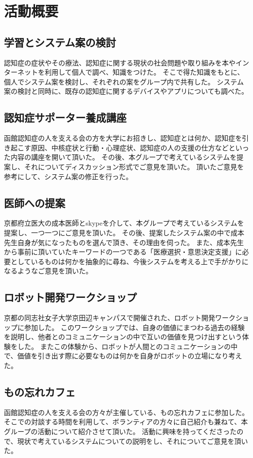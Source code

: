 \documentclass[../report]{subfiles}
\begin{document}
\section{活動概要}
\subsection{学習とシステム案の検討}\label{sec:kentou}
認知症の症状やその療法、認知症に関する現状の社会問題や取り組みを本やインターネットを利用して個人で調べ、知識をつけた。
そこで得た知識をもとに、個人でシステム案を検討し、それぞれの案をグループ内で共有した。
システム案の検討と同時に、既存の認知症に関するデバイスやアプリについても調べた。

\subsection{認知症サポーター養成講座}
函館認知症の人を支える会の方を大学にお招きし、認知症とは何か、認知症を引き起こす原因、中核症状と行動・心理症状、認知症の人の支援の仕方などといった内容の講座を開いて頂いた。
その後、本グループで考えているシステムを提案し、それについてディスカッション形式でご意見を頂いた。
頂いたご意見を参考にして、システム案の修正を行った。

\subsection{医師への提案}
京都府立医大の成本医師とskypeを介して、本グループで考えているシステムを提案し、一つ一つにご意見を頂いた。
その後、提案したシステム案の中で成本先生自身が気になったものを選んで頂き、その理由を伺った。
また、成本先生から事前に頂いていたキーワードの一つである「医療選択・意思決定支援」に必要としているものは何かを抽象的に尋ね、今後システムを考える上で手がかりになるようなご意見を頂いた。

\subsection{ロボット開発ワークショップ}
京都の同志社女子大学京田辺キャンパスで開催された、ロボット開発ワークショップに参加した。
このワークショップでは、自身の価値にまつわる過去の経験を説明し、他者とのコミュニケーションの中で互いの価値を見つけ出すという体験をした。
またこの体験から、ロボットが人間とのコミュニケーションの中で、価値を引き出す際に必要なものは何かを自身がロボットの立場になり考えた。

\subsection{もの忘れカフェ}
函館認知症の人を支える会の方々が主催している、もの忘れカフェに参加した。
そこでの対談する時間を利用して、ボランティアの方々に自己紹介も兼ねて、本グループの活動について紹介させて頂いた。
活動に興味を持ってくださったので、現状で考えているシステムについての説明をし、それについてご意見を頂いた。
\end{document}
